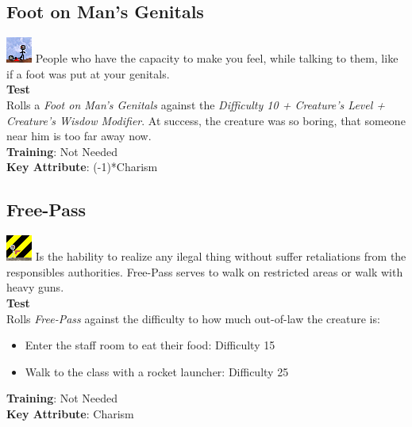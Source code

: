 \documentclass[ letterpaper,12pt]{article}
\begin{document}
\subsection{Foot on Man's Genitals}
\includegraphics{../data/skills/Img/penosaco.png}
People who have the capacity to make you feel, while talking to them, like if a foot was put at your genitals.\\
{\bf Test}\\
Rolls a {\it Foot on Man's Genitals} against the {\it Difficulty 10 + Creature's Level + Creature's Wisdow Modifier}. At success, the creature was so boring, that someone near him is too far away now.\\
{\bf Training}: Not Needed\\
{\bf Key Attribute}: (-1)*Charism\\

\subsection{Free-Pass}
\includegraphics{../data/skills/Img/passelivre.png}
Is the hability to realize any ilegal thing without suffer retaliations from the responsibles authorities. Free-Pass serves to walk on restricted areas or walk with heavy guns.\\
{\bf Test}\\
Rolls {\it Free-Pass} against the difficulty to how much out-of-law the creature is:
\begin{itemize}
\item{Enter the staff room to eat their food: Difficulty 15}
\item{Walk to the class with a rocket launcher: Difficulty 25}
\end{itemize}
{\bf Training}: Not Needed\\
{\bf Key Attribute}: Charism
\end{document}
